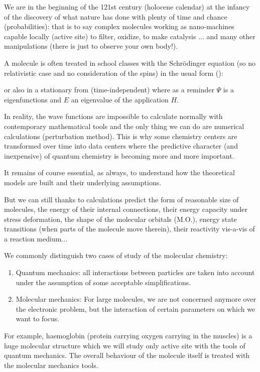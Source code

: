 	We are in the beginning of the 121st century (holocene calendar) at the infancy of the discovery of what nature has done with plenty of time and chance (probabilities): that is to say complex molecules working as nano-machines capable locally (active site) to filter, oxidize, to make catalysis ... and many other manipulations (there is just to observe your own body!).
	
	A molecule is often treated in school classes with the Schrödinger equation (so no relativistic case and no consideration of the spins) in the usual form ():
	
	or also in a stationary from (time-independent) where as a reminder $\Psi$ is a eigenfunctions and $E$ an eigenvalue of the application $H$.
	
	In reality, the wave functions are impossible to calculate normally with contemporary mathematical tools and the only thing we can do are numerical calculations (perturbation method). This is why some chemistry centers are transformed over time into data centers where the predictive character (and inexpensive) of quantum chemistry is becoming more and more important.
	
	It remains of course essential, as always, to understand how the theoretical models are built and their underlying assumptions.
	
	But we can still thanks to calculations predict the form of reasonable size of molecules, the energy of their internal connections, their energy capacity under stress deformation, the shape of the molecular orbitals (M.O.), energy state transitions (when parts of the molecule move therein), their reactivity vis-a-vis of a reaction medium...
	
	We commonly distinguish two cases of study of the molecular chemistry:
	\begin{enumerate}
		\item Quantum mechanics: all interactions between particles are taken into account under the assumption of some acceptable simplifications.
		\item Molecular mechanics: For large molecules, we are not concerned anymore over the electronic problem, but the interaction of certain parameters on which we want to focus.
	\end{enumerate}
	For example, haemoglobin (protein carrying oxygen carrying in the muscles) is a huge molecular structure which we will study only active site with the tools of quantum mechanics. The overall behaviour of the molecule itself is treated with the molecular mechanics tools.
	
